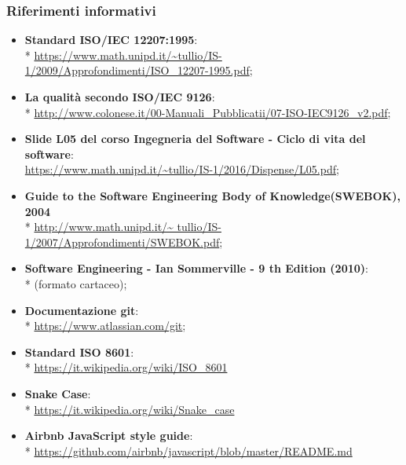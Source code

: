 \subsubsection{Riferimenti informativi}
\begin{itemize}
	\item \textbf{ Standard ISO/IEC 12207:1995}:\\* 
	\url{https://www.math.unipd.it/~tullio/IS-1/2009/Approfondimenti/ISO_12207-1995.pdf};
	\item \textbf{La qualità secondo ISO/IEC 9126}: \\*
	\url{http://www.colonese.it/00-Manuali_Pubblicatii/07-ISO-IEC9126_v2.pdf};
	\item \textbf{Slide L05 del corso Ingegneria del Software - Ciclo di vita 
	del software}:\\
		\url{https://www.math.unipd.it/~tullio/IS-1/2016/Dispense/L05.pdf};
	\item \textbf{Guide to the Software Engineering Body of Knowledge(SWEBOK), 2004} \\*
		\url{http://www.math.unipd.it/~	tullio/IS-1/2007/Approfondimenti/SWEBOK.pdf};
	\item \textbf{Software Engineering - Ian Sommerville - 9 th Edition (2010)}: \\*
		(formato cartaceo);
	\item \textbf{Documentazione git}: \\*
		\url{https://www.atlassian.com/git};
	\item \textbf{Standard ISO 8601}: \\*
		\url{https://it.wikipedia.org/wiki/ISO_8601}
	\item \textbf{Snake Case}\glo: \\*
		\url{https://it.wikipedia.org/wiki/Snake_case}
	\item \textbf{Airbnb JavaScript style guide}: \\*
		\url{https://github.com/airbnb/javascript/blob/master/README.md}
	
	
	
	
\end{itemize}
